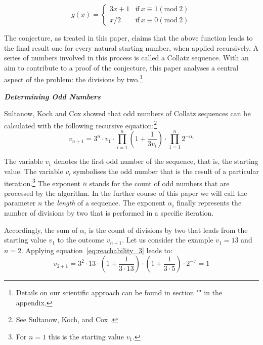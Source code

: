 \documentclass{SciPress_2015}
\renewcommand{\subsection}[1]{\textit{\textbf{#1}}}
\begin{document}
\begin{equation}
\label{eq:func_collatz}
g(x)=
\begin{cases}
3x+1	&	\text{if}\ x\equiv 1(\textrm{mod}\ 2)\\
x/2		&	\text{if}\ x\equiv 0(\textrm{mod}\ 2)
\end{cases}
\end{equation}

The conjecture, as treated in this paper, claims that the above function leads to the final result one for every natural starting number, when applied recursively. A series of numbers involved in this process is called a Collatz sequence. With an aim to contribute to a proof of the conjecture, this paper analyses a central aspect of the problem: the divisions by two.\footnote{Details on our scientific approach can be found in section "" in the appendix.}

\vspace{1em}\noindent
\subsection{Determining Odd Numbers}
\par\noindent
Sultanow, Koch and Cox showed that odd numbers of Collatz sequences can be calculated with the following recursive equation:\footnote{See Sultanow, Koch, and Cox \cite[p.~10]{Ref_Sultanow_Koch_Cox_2020}.}
\begin{equation}
\label{eq:reachability_3}
v_{n+1}=3^n\cdot v_1\cdot\prod_{i=1}^{n}\left(1+\frac{1}{3v_{i}}\right)\cdot\prod_{1=1}^{n}2^{-\alpha_i}
\end{equation}

The variable $v_1$ denotes the first odd number of the sequence, that is, the starting value. The variable $v_i$ symbolises the odd number that is the result of a particular iteration.\footnote{For $n=1$ this is the starting value $v_1$.} The exponent $n$ stands for the count of odd numbers that are processed by the algorithm. In the further course of this paper we will call the parameter $n$ the \textit{length} of a sequence. The exponent $\alpha_i$ finally represents the number of divisions by two that is performed in a specific iteration.

\newpage
\par\noindent
Accordingly, the sum of $\alpha_i$ is the count of divisions by two that leads from the starting value $v_1$  to the outcome $v_{n+1}$. Let us consider the example $v_1=13$ and $n=2$. Applying equation~\ref{eq:reachability_3} leads to:
\[
v_{2+1}=3^2\cdot 13\cdot\left(1+\frac{1}{3\cdot13}\right)\cdot\left(1+\frac{1}{3\cdot5}\right)\cdot2^{-7}=1
\]
\end{document}
